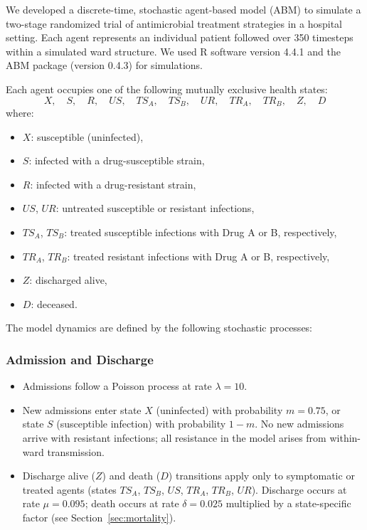 \documentclass[preprint,11pt]{elsarticle}
\begin{document}
We developed a discrete-time, stochastic agent-based model (ABM) to simulate a two-stage randomized trial of antimicrobial treatment strategies in a hospital setting. Each agent represents an individual patient followed over 350 timesteps within a simulated ward structure. We used R software version 4.4.1 and the ABM package (version 0.4.3) for simulations.

Each agent occupies one of the following mutually exclusive health states:
\[
X,\quad S,\quad R,\quad US,\quad TS_A,\quad TS_B,\quad UR,\quad TR_A,\quad TR_B,\quad Z,\quad D
\]
where:
\begin{itemize}
  \item $X$: susceptible (uninfected),
  \item $S$: infected with a drug-susceptible strain,
  \item $R$: infected with a drug-resistant strain,
  \item $US$, $UR$: untreated susceptible or resistant infections,
  \item $TS_A$, $TS_B$: treated susceptible infections with Drug A or B, respectively,
  \item $TR_A$, $TR_B$: treated resistant infections with Drug A or B, respectively,
  \item $Z$: discharged alive,
  \item $D$: deceased.
\end{itemize}

The model dynamics are defined by the following stochastic processes:

\subsubsection{Admission and Discharge}
\begin{itemize}
  \item Admissions follow a Poisson process at rate $\lambda = 10$.
  \item New admissions enter state $X$ (uninfected) with probability $m = 0.75$, or state $S$ (susceptible infection) with probability $1 - m$. No new admissions arrive with resistant infections; all resistance in the model arises from within-ward transmission.
  \item Discharge alive ($Z$) and death ($D$) transitions apply only to symptomatic or treated agents (states $TS_A$, $TS_B$, $US$, $TR_A$, $TR_B$, $UR$). Discharge occurs at rate $\mu = 0.095$; death occurs at rate $\delta = 0.025$ multiplied by a state-specific factor (see Section~\ref{sec:mortality}).
\end{itemize}
\end{document}

